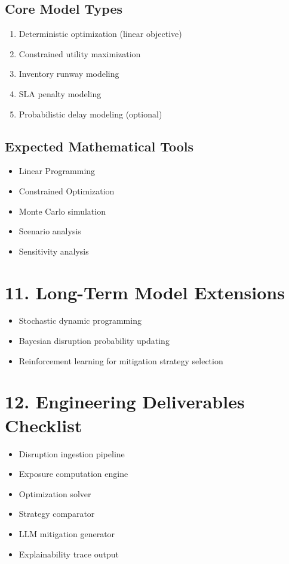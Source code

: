 \documentclass[11pt]{article}
\begin{document}
\subsection*{Core Model Types}

\begin{enumerate}
    \item Deterministic optimization (linear objective)
    \item Constrained utility maximization
    \item Inventory runway modeling
    \item SLA penalty modeling
    \item Probabilistic delay modeling (optional)
\end{enumerate}

\subsection*{Expected Mathematical Tools}

\begin{itemize}
    \item Linear Programming
    \item Constrained Optimization
    \item Monte Carlo simulation
    \item Scenario analysis
    \item Sensitivity analysis
\end{itemize}

\section*{11. Long-Term Model Extensions}

\begin{itemize}
    \item Stochastic dynamic programming
    \item Bayesian disruption probability updating
    \item Reinforcement learning for mitigation strategy selection
\end{itemize}

\section*{12. Engineering Deliverables Checklist}

\begin{itemize}
    \item Disruption ingestion pipeline
    \item Exposure computation engine
    \item Optimization solver
    \item Strategy comparator
    \item LLM mitigation generator
    \item Explainability trace output
\end{itemize}
\end{document}
